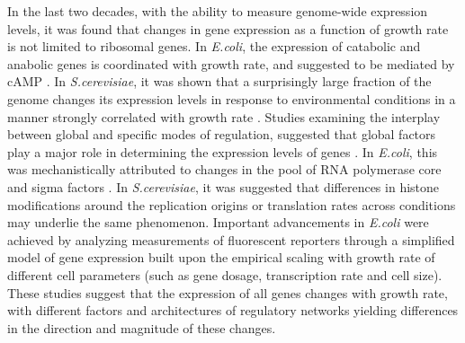 In the last two decades, with the ability to measure genome-wide expression levels, it was found that changes in gene expression as a function of growth rate is not limited to ribosomal genes.
In \emph{E.coli}, the expression of catabolic and anabolic genes is coordinated with growth rate, and suggested to be mediated by cAMP \cite{Saldanha2004,You_2013,Peebo_2015}.
In \emph{S.cerevisiae}, it was shown that a surprisingly large fraction of the genome changes its expression levels in response to environmental conditions in a manner strongly correlated with growth rate \cite{Keren2013a,Brauer2008,Castrillo2007,Gerosa2013}.
Studies examining the interplay between global and specific modes of regulation, suggested that global factors play a major role in determining the expression levels of genes \cite{Gasch2000,Klumpp2009,Scott2010,Berthoumieux2013,Keren2013a,Gerosa2013,Valgepea2013,Hui_2015}.
In \emph{E.coli}, this was mechanistically attributed to changes in the pool of RNA polymerase core and sigma factors \cite{Klumpp2008}.
In \emph{S.cerevisiae}, it was suggested that differences in histone modifications around the replication origins \cite{Regenberg2006} or translation rates \cite{Brauer2008} across conditions may underlie the same phenomenon.
Important advancements in \emph{E.coli} were achieved by analyzing measurements of fluorescent reporters through a simplified model of gene expression built upon the empirical scaling with growth rate of different cell parameters (such as gene dosage, transcription rate and cell size)\cite{Klumpp2009}.
These studies suggest that the expression of all genes changes with growth rate, with different factors and architectures of regulatory networks yielding differences in the direction and magnitude of these changes. 